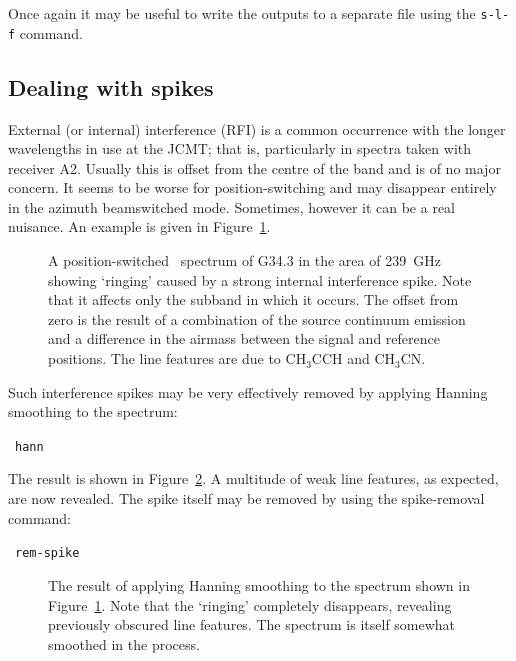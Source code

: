 Once again it may be useful to write the outputs to a separate file
using the {\tt s-l-f} command.

\subsection{Dealing with spikes}
\label{sec:spike-removal}
External (or internal) interference (RFI) is a common occurrence with
the longer wavelengths in use at the JCMT; that is, particularly in
spectra taken with receiver A2. Usually this is offset from the centre
of the band and is of no major concern. It seems to be worse for
position-switching and may disappear entirely in the azimuth
beamswitched mode. Sometimes, however it can be a real nuisance. An
example is given in Figure~\ref{fig:spikes}.

\begin{figure}[htb]
\centering
\leavevmode
\epsfysize=3.5in
\vspace*{-0.5cm}
\begin{center}
\begin{minipage}[t]{5.5in}
\caption[`Ringing' in a spectrum]
{\small{A position-switched \das\ spectrum of G34.3 in the area of
239~GHz showing `ringing' caused by a strong internal interference
spike. Note that it affects only the subband in which it occurs. The
offset from zero is the result of a combination of the source
continuum emission and a difference in the airmass between the signal
and reference positions. The line features are due to CH$_3$CCH and
CH$_3$CN.  }}
\label{fig:spikes}
\end{minipage}
\end{center}
\end{figure}

Such interference spikes may be very effectively removed by applying
Hanning smoothing to the spectrum:

\SP\ {\tt hann}

The result is shown in Figure~\ref{fig:despiked}. A multitude of weak
line features, as expected, are now revealed. The spike itself may be
removed by using the spike-removal command:

\SP\ {\tt rem-spike}

\begin{figure}[htb]
\centering
\leavevmode
\epsfysize=3.5in
\vspace*{-0.5cm}
\begin{center}
\begin{minipage}[t]{5.5in}
\caption[Hanning-smoothing removes `ringing']
{\small{The result of applying Hanning smoothing to the spectrum shown
in Figure~\ref{fig:spikes}. Note that the `ringing' completely
disappears, revealing previously obscured line features. The spectrum
is itself somewhat smoothed in the process.  }}
\label{fig:despiked}
\end{minipage}
\end{center}
\end{figure}





